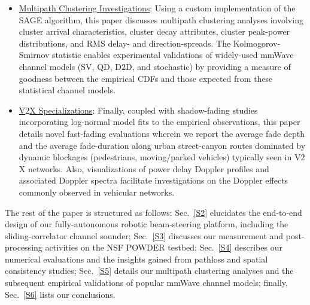\documentclass[12pt, draftcls, onecolumn]{IEEEtran}
\begin{document}
\begin{itemize}[leftmargin=*]
    \item \underline{Multipath Clustering Investigations}: Using a custom implementation of the SAGE algorithm, this paper discusses multipath clustering analyses involving cluster arrival characteristics, cluster decay attributes, cluster peak-power distributions, and RMS delay- and direction-spreads. The Kolmogorov-Smirnov statistic enables experimental validations of widely-used mmWave channel models (SV, QD, D$2$D, and stochastic) by providing a measure of goodness between the empirical CDFs and those expected from these statistical channel models.
    \item \underline{V$2$X Specializations}: Finally, coupled with shadow-fading studies incorporating log-normal model fits to the empirical observations, this paper details novel fast-fading evaluations wherein we report the average fade depth and the average fade-duration along urban street-canyon routes dominated by dynamic blockages (pedestrians, moving/parked vehicles) typically seen in V$2$X networks. Also, visualizations of power delay Doppler profiles and associated Doppler spectra facilitate investigations on the Doppler effects commonly observed in vehicular networks.
\end{itemize}

The rest of the paper is structured as follows: Sec.~\ref{S2} elucidates the end-to-end design of our fully-autonomous robotic beam-steering platform, including the sliding-correlator channel sounder; Sec.~\ref{S3} discusses our measurement and post-processing activities on the NSF POWDER testbed; Sec.~\ref{S4} describes our numerical evaluations and the insights gained from pathloss and spatial consistency studies; Sec.~\ref{S5} details our multipath clustering analyses and the subsequent empirical validations of popular mmWave channel models; finally, Sec.~\ref{S6} lists our conclusions.
\vspace{-3mm}

\end{document}
